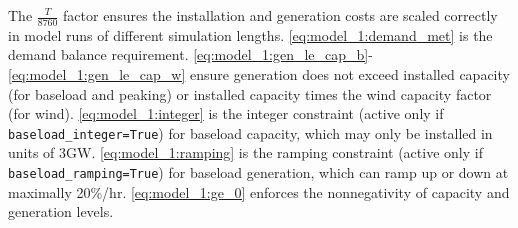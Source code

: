 \documentclass[preprint]{elsarticle}
\begin{document}
\noindent The $\frac{T}{8760}$ factor ensures the installation and generation costs are scaled correctly in model runs of different simulation lengths. \eqref{eq:model_1:demand_met} is the demand balance requirement. \eqref{eq:model_1:gen_le_cap_b}-\eqref{eq:model_1:gen_le_cap_w} ensure generation does not exceed installed capacity (for baseload and peaking) or installed capacity times the wind capacity factor (for wind). \eqref{eq:model_1:integer} is the integer constraint (active only if \texttt{baseload\_integer=True}) for baseload capacity, which may only be installed in units of 3GW. \eqref{eq:model_1:ramping} is the ramping constraint (active only if \texttt{baseload\_ramping=True}) for baseload generation, which can ramp up or down at maximally 20\%/hr. \eqref{eq:model_1:ge_0} enforces the nonnegativity of capacity and generation levels.
\end{document}
